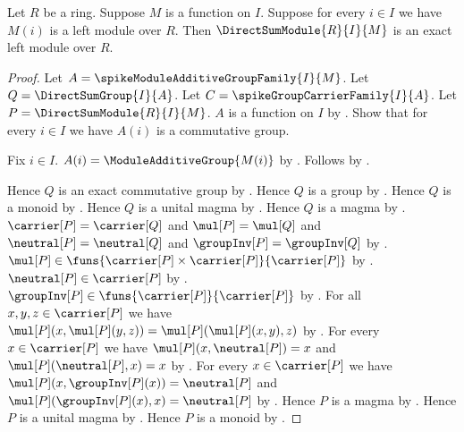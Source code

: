 \begin{theorem}\label{spike_direct_sum_module_is_exact}
    Let $R$ be a ring.
    Suppose $M$ is a function on $I$.
    Suppose for every $i\in I$ we have $M(i)$ is a left module over $R$.
    Then $\DirectSumModule{R}{I}{M}$
        is an exact left module over $R$.
\end{theorem}
\begin{proof}
    Let $A=\spikeModuleAdditiveGroupFamily{I}{M}$.
    Let $Q=\DirectSumGroup{I}{A}$.
    Let $C=\spikeGroupCarrierFamily{I}{A}$.
    Let $P=\DirectSumModule{R}{I}{M}$.
    $A$ is a function on $I$ by
        .
    Show that for every $i\in I$ we have $A(i)$ is a commutative group.
    \begin{subproof}
        Fix $i\in I$.
        $A(i)=\ModuleAdditiveGroup{M(i)}$ by
            .
        Follows by .
    \end{subproof}
    Hence $Q$ is an exact commutative group by
        .
    Hence $Q$ is a group by .
    Hence $Q$ is a monoid by .
    Hence $Q$ is a unital magma by .
    Hence $Q$ is a magma by .
    $\carrier[P]=\carrier[Q]$ and $\mul[P]=\mul[Q]$ and
        $\neutral[P]=\neutral[Q]$ and
        $\groupInv[P]=\groupInv[Q]$ by
        .
    $\mul[P]\in
        \funs{\carrier[P]\times\carrier[P]}{\carrier[P]}$ by
        .
    $\neutral[P]\in\carrier[P]$ by .
    $\groupInv[P]\in\funs{\carrier[P]}{\carrier[P]}$ by
        .
    For all $x,y,z\in\carrier[P]$ we have
        $\mul[P](x,\mul[P](y,z))=\mul[P](\mul[P](x,y),z)$ by
        .
    For every $x\in\carrier[P]$ we have
        $\mul[P](x,\neutral[P])=x$ and
        $\mul[P](\neutral[P],x)=x$ by
        .
    For every $x\in\carrier[P]$ we have
        $\mul[P](x,\groupInv[P](x))=\neutral[P]$ and
        $\mul[P](\groupInv[P](x),x)=\neutral[P]$ by
        .
    Hence $P$ is a magma by
        .
    Hence $P$ is a unital magma by
        .
    Hence $P$ is a monoid by
        .

\end{proof}

